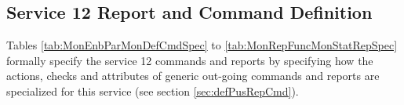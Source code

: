 \documentclass{pnp_article}
\begin{document}
\subsection{Service 12 Report and Command Definition}\label{sec:serv12RepCmdDef}
Tables \ref{tab:MonEnbParMonDefCmdSpec} to \ref{tab:MonRepFuncMonStatRepSpec} formally specify the service 12 commands and reports by specifying how the actions, checks and attributes of generic out-going commands and reports are specialized for this service (see section \ref{sec:defPusRepCmd}). 


\newpage
{}

\newpage
{}

\newpage
{}

\newpage
{}
 
\newpage
{}

\newpage
{}


\newpage
{}

\newpage
{}

\newpage
{}

\newpage
{}

\newpage
{}

\newpage
{}

\newpage
{}
\end{document}
